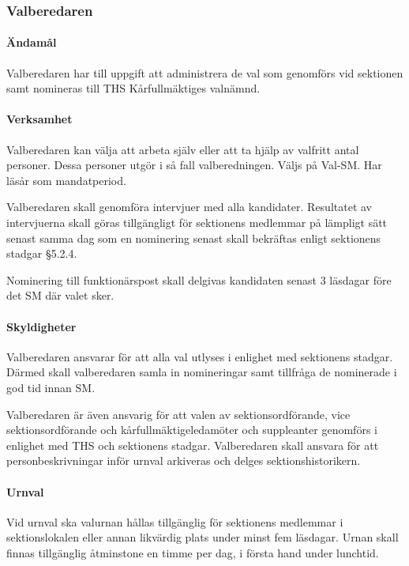 \documentclass{dgovdoc}
\begin{document}
\subsubsection{Valberedaren}

\paragraph{Ändamål}

Valberedaren har till uppgift att administrera de val som genomförs vid sektionen samt nomineras till THS Kårfullmäktiges valnämnd.

\paragraph{Verksamhet}

Valberedaren kan välja att arbeta själv eller att ta hjälp av valfritt antal personer. Dessa personer utgör i så fall valberedningen. Väljs på Val-SM. Har läsår som mandatperiod.

Valberedaren skall genomföra intervjuer med alla kandidater.
Resultatet av intervjuerna skall göras tillgängligt för sektionens medlemmar på lämpligt sätt
senast samma dag som en nominering senast skall bekräftas enligt sektionens stadgar \S5.2.4.

Nominering till funktionärspost skall delgivas kandidaten senast 3 läsdagar före det SM där valet sker.

\paragraph{Skyldigheter}

Valberedaren ansvarar för att alla val utlyses i enlighet med sektionens stadgar. Därmed skall valberedaren samla in nomineringar samt tillfråga de nominerade i god tid innan SM.

Valberedaren är även ansvarig för att valen av sektionsordförande, vice sektionsordförande och kårfullmäktigeledamöter och suppleanter genomförs i enlighet med THS och sektionens stadgar. Valberedaren skall ansvara för att personbeskrivningar inför urnval arkiveras och delges sektionshistorikern.

\paragraph{Urnval}

Vid urnval ska valurnan hållas tillgänglig för sektionens medlemmar i sektionslokalen eller annan likvärdig plats under minst fem läsdagar. Urnan skall finnas tillgänglig åtminstone en timme per dag, i första hand under lunchtid.
\end{document}
